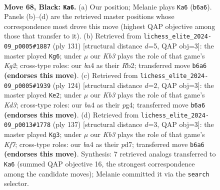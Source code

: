\documentclass[11pt]{article}
\begin{document}
\clearpage

\begin{figure}[p]\centering
\begin{subfigure}{0.46\textwidth}\centering
\resizebox{\linewidth}{!}{%
\newchessgame
\chessboard[
  setfen={8/5R2/1k6/8/B4P2/4K3/7P/8 b - - 2 68},
  showmover=false,
  pgfstyle=straightmove, color=movearrow, markmove={b6-a6}
]}
\caption{}
\end{subfigure}\hfill
\begin{subfigure}{0.46\textwidth}\centering
\resizebox{\linewidth}{!}{%
\newchessgame
\chessboard[
  setfen={8/6k1/8/5R2/8/5PK1/1r6/8 b - - 2 66},
  showmover=false,
  pgfstyle=straightmove, color=movearrow, markmove={g7-g6}
]}
\caption{}
\end{subfigure}
\\[4pt]
\begin{subfigure}{0.46\textwidth}\centering
\resizebox{\linewidth}{!}{%
\newchessgame
\chessboard[
  setfen={8/6pk/8/8/1r4p1/3K4/8/8 w - - 0 63},
  showmover=false,
  pgfstyle=straightmove, color=movearrow, markmove={d3-e2}
]}
\caption{}
\end{subfigure}\hfill
\begin{subfigure}{0.46\textwidth}\centering
\resizebox{\linewidth}{!}{%
\newchessgame
\chessboard[
  setfen={8/3P4/8/2R2P2/4K3/8/5k2/8 b - - 0 69},
  showmover=false,
  pgfstyle=straightmove, color=movearrow, markmove={f2-g3}
]}
\caption{}
\end{subfigure}
\caption{\textbf{Move 68, Black: \texttt{Ka6}.} (a) Our position; Melanie plays \texttt{Ka6} (\texttt{b6a6}). Panels (b)--(d) are the retrieved master positions whose correspondence most drove this move (highest QAP objective among those that transfer to it). (b) Retrieved from \texttt{lichess\_elite\_2024-09\_p0005\#1887} (ply 131) [structural distance $d$=5, QAP obj=3]: the master played \texttt{Kg6}; under $\mu$ our \emph{Kb3} plays the role of that game's \emph{Kg2}; cross-type roles: our \emph{b}a4 as their \emph{R}b2; transferred move \texttt{b6a6} \textbf{(endorses this move)}. (c) Retrieved from \texttt{lichess\_elite\_2024-09\_p0005\#1939} (ply 124) [structural distance $d$=2, QAP obj=3]: the master played \texttt{Ke2}; under $\mu$ our \emph{Kb3} plays the role of that game's \emph{Kd3}; cross-type roles: our \emph{b}a4 as their \emph{p}g4; transferred move \texttt{b6a6} \textbf{(endorses this move)}. (d) Retrieved from \texttt{lichess\_elite\_2024-09\_p0013\#1778} (ply 137) [structural distance $d$=3, QAP obj=3]: the master played \texttt{Kg3}; under $\mu$ our \emph{Kb3} plays the role of that game's \emph{Kf7}; cross-type roles: our \emph{b}a4 as their \emph{p}d7; transferred move \texttt{b6a6} \textbf{(endorses this move)}. Synthesis: 7 retrieved analogs transferred to \texttt{Ka6} (summed QAP objective 16, the strongest correspondence among the candidate moves); Melanie committed it via the \texttt{search} selector.}
\label{fig:thought-m135}
\end{figure}
\end{document}
